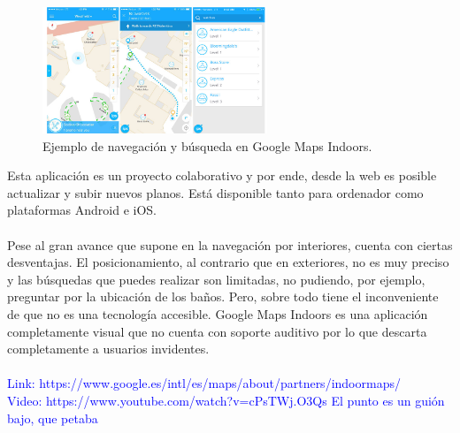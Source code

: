 \documentclass{article}
\begin{document}
		 \begin{figure}[h!]
			\centering
			\includegraphics[width=0.6\textwidth]{GMapsInd}
			\caption{Ejemplo de navegación y búsqueda en Google Maps Indoors. }
			\label{fig:ejemplo}
		\end{figure}
		Esta aplicación es un proyecto colaborativo y por ende, desde la web es posible actualizar y subir nuevos planos. Está disponible tanto para ordenador como plataformas Android e iOS.
		\\
		\\
		Pese al gran avance que supone en la navegación por interiores, cuenta con ciertas desventajas. El posicionamiento, al contrario que en exteriores, no es muy preciso y las búsquedas que puedes realizar son limitadas, no pudiendo, por ejemplo, preguntar por la ubicación de los baños. Pero, sobre todo tiene el inconveniente de que no es una tecnología accesible. Google Maps Indoors es una aplicación completamente visual que no cuenta con soporte auditivo por lo que descarta completamente a usuarios invidentes.
		\\
		\\
		
		\textcolor{blue}{Link: https://www.google.es/intl/es/maps/about/partners/indoormaps/
		\\
		Video: https://www.youtube.com/watch?v=cPsTWj.O3Qs El punto es un guión bajo, que petaba}	
		\\
	
	
		
\end{document}
